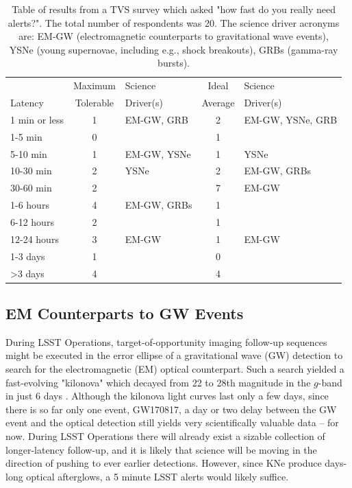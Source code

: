 \documentclass[DM,lsstdraft,authoryear,toc]{lsstdoc}
\begin{document}
\begin{table}[h]%
\caption{Table of results from a TVS survey which asked "how fast do you really need alerts?". The total number of respondents was 20. The science driver acronyms are: EM-GW (electromagnetic counterparts to gravitational wave events), YSNe (young supernovae, including e.g., shock breakouts), GRBs (gamma-ray bursts). \label{tab:tvs}}
\begin{center}
\begin{tabular}{|l|cl|cl|}
\hline
             & Maximum & Science & Ideal       & Science \\
Latency & Tolerable  & Driver(s) &  Average & Driver(s) \\
\hline
1 min or less & 1 & EM-GW, GRB  & 2 & EM-GW, YSNe, GRB \\
1-5 min         & 0 &                          & 1 &                                   \\
5-10 min       & 1 & EM-GW, YSNe & 1 & YSNe \\
10-30 min     & 2 & YSNe               & 2 & EM-GW, GRBs \\
30-60 min     & 2 &                          & 7 & EM-GW  \\
1-6 hours     & 4 & EM-GW, GRBs & 1 &  \\
6-12 hours   & 2 &                          & 1 &  \\
12-24 hours & 3 & EM-GW            & 1 & EM-GW \\
1-3 days      & 1 &                           & 0 &  \\
>3 days       & 4 &                           & 4 &  \\
\hline
\end{tabular}
\end{center}
\label{default}
\end{table}%


\subsection{EM Counterparts to GW Events}\label{ssec:latency_emgw}

During LSST Operations, target-of-opportunity imaging follow-up sequences might be executed in the error ellipse of a gravitational wave (GW) detection to search for the electromagnetic (EM) optical counterpart. Such a search yielded a fast-evolving "kilonova" which decayed from 22 to 28th magnitude in the $g$-band in just 6 days \citep[faster in the bluer and slower in the redder filters][]{2017Sci...358.1559K}. Although the kilonova light curves last only a few days, since there is so far only one event, GW170817, a day or two delay between the GW event and the optical detection still yields very scientifically valuable data -- for now. During LSST Operations there will already exist a sizable collection of longer-latency follow-up, and it is likely that science will be moving in the direction of pushing to ever earlier detections. However, since KNe produce days-long optical afterglows, a 5 minute LSST alerts would likely suffice.
\end{document}
